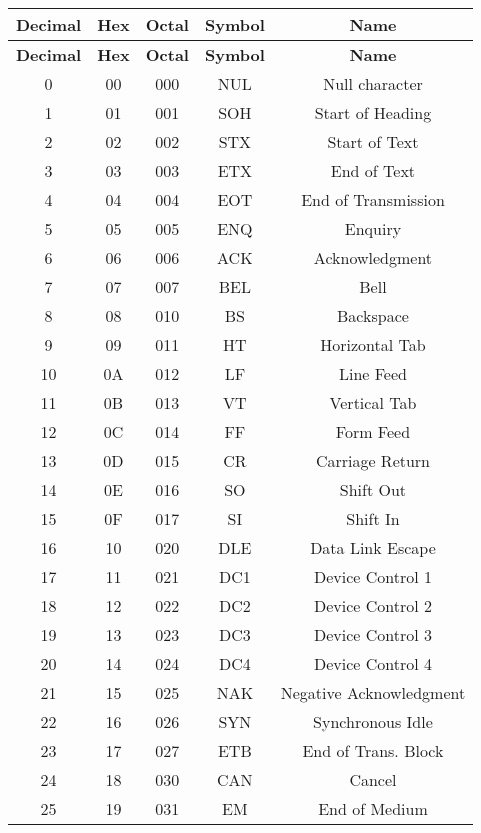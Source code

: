 \documentclass[12pt]{article} %
\begin{document}
\begin{longtable}{|c|c|c|c|c|}
    \hline
    \textbf{Decimal} & \textbf{Hex} & \textbf{Octal} & \textbf{Symbol} & \textbf{Name} \\
    \hline
    \endfirsthead
    \hline
    \textbf{Decimal} & \textbf{Hex} & \textbf{Octal} & \textbf{Symbol} & \textbf{Name} \\
    \hline
    \endhead
    \hline
    \endfoot
    
    0 & 00 & 000 & NUL & Null character \\
    1 & 01 & 001 & SOH & Start of Heading \\
    2 & 02 & 002 & STX & Start of Text \\
    3 & 03 & 003 & ETX & End of Text \\
    4 & 04 & 004 & EOT & End of Transmission \\
    5 & 05 & 005 & ENQ & Enquiry \\
    6 & 06 & 006 & ACK & Acknowledgment \\
    7 & 07 & 007 & BEL & Bell \\
    8 & 08 & 010 & BS  & Backspace \\
    9 & 09 & 011 & HT  & Horizontal Tab \\
    10 & 0A & 012 & LF  & Line Feed \\
    11 & 0B & 013 & VT  & Vertical Tab \\
    12 & 0C & 014 & FF  & Form Feed \\
    13 & 0D & 015 & CR  & Carriage Return \\
    14 & 0E & 016 & SO  & Shift Out \\
    15 & 0F & 017 & SI  & Shift In \\
    16 & 10 & 020 & DLE & Data Link Escape \\
    17 & 11 & 021 & DC1 & Device Control 1 \\
    18 & 12 & 022 & DC2 & Device Control 2 \\
    19 & 13 & 023 & DC3 & Device Control 3 \\
    20 & 14 & 024 & DC4 & Device Control 4 \\
    21 & 15 & 025 & NAK & Negative Acknowledgment \\
    22 & 16 & 026 & SYN & Synchronous Idle \\
    23 & 17 & 027 & ETB & End of Trans. Block \\
    24 & 18 & 030 & CAN & Cancel \\
    25 & 19 & 031 & EM  & End of Medium \\

\end{longtable}
\end{document}
